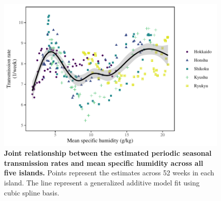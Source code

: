 \documentclass[12pt]{article}
\begin{document}
\begin{figure}[!th]
\includegraphics[width=\textwidth]{../figure/figure_joint_climate.pdf}
\caption{
\textbf{Joint relationship between the estimated periodic seasonal transmission rates and mean specific humidity across all five islands.}
Points represent the estimates across 52 weeks in each island.
The line represent a generalized additive model fit using cubic spline basis.
}
\end{figure}

\pagebreak
\end{document}

